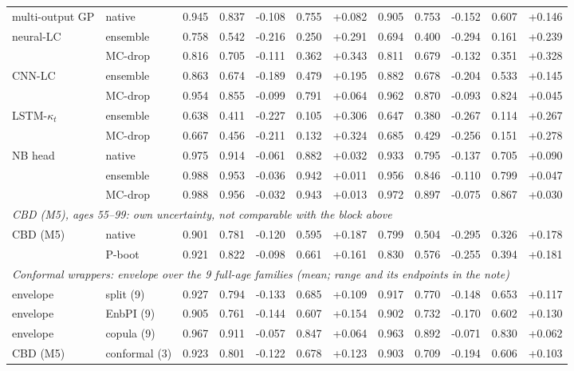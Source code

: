 \begin{table}[tbp]
\begin{threeparttable}
\begin{tabular}{@{}llrrrrrrrrrr@{}}
multi-output GP & native & 0.945 & 0.837 & -0.108 & 0.755 & +0.082 & 0.905 & 0.753 & -0.152 & 0.607 & +0.146 \\
neural-LC & ensemble & 0.758 & 0.542 & -0.216 & 0.250 & +0.291 & 0.694 & 0.400 & -0.294 & 0.161 & +0.239 \\
 & MC-drop & 0.816 & 0.705 & -0.111 & 0.362 & +0.343 & 0.811 & 0.679 & -0.132 & 0.351 & +0.328 \\
CNN-LC & ensemble & 0.863 & 0.674 & -0.189 & 0.479 & +0.195 & 0.882 & 0.678 & -0.204 & 0.533 & +0.145 \\
 & MC-drop & 0.954 & 0.855 & -0.099 & 0.791 & +0.064 & 0.962 & 0.870 & -0.093 & 0.824 & +0.045 \\
LSTM-$\kappa_t$ & ensemble & 0.638 & 0.411 & -0.227 & 0.105 & +0.306 & 0.647 & 0.380 & -0.267 & 0.114 & +0.267 \\
 & MC-drop & 0.667 & 0.456 & -0.211 & 0.132 & +0.324 & 0.685 & 0.429 & -0.256 & 0.151 & +0.278 \\
NB head & native & 0.975 & 0.914 & -0.061 & 0.882 & +0.032 & 0.933 & 0.795 & -0.137 & 0.705 & +0.090 \\
 & ensemble & 0.988 & 0.953 & -0.036 & 0.942 & +0.011 & 0.956 & 0.846 & -0.110 & 0.799 & +0.047 \\
 & MC-drop & 0.988 & 0.956 & -0.032 & 0.943 & +0.013 & 0.972 & 0.897 & -0.075 & 0.867 & +0.030 \\
\multicolumn{12}{l}{\emph{CBD (M5), ages 55--99: own uncertainty, not comparable with the block above}} \\
\midrule
CBD (M5) & native & 0.901 & 0.781 & -0.120 & 0.595 & +0.187 & 0.799 & 0.504 & -0.295 & 0.326 & +0.178 \\
 & P-boot & 0.921 & 0.822 & -0.098 & 0.661 & +0.161 & 0.830 & 0.576 & -0.255 & 0.394 & +0.181 \\
\multicolumn{12}{l}{\emph{Conformal wrappers: envelope over the 9 full-age families (mean; range and its endpoints in the note)}} \\
\midrule
envelope & split (9) & 0.927 & 0.794 & -0.133 & 0.685 & +0.109 & 0.917 & 0.770 & -0.148 & 0.653 & +0.117 \\
envelope & EnbPI (9) & 0.905 & 0.761 & -0.144 & 0.607 & +0.154 & 0.902 & 0.732 & -0.170 & 0.602 & +0.130 \\
envelope & copula (9) & 0.967 & 0.911 & -0.057 & 0.847 & +0.064 & 0.963 & 0.892 & -0.071 & 0.830 & +0.062 \\
CBD (M5) & conformal (3) & 0.923 & 0.801 & -0.122 & 0.678 & +0.123 & 0.903 & 0.709 & -0.194 & 0.606 & +0.103 \\

\end{tabular}
\end{threeparttable}
\end{table}
